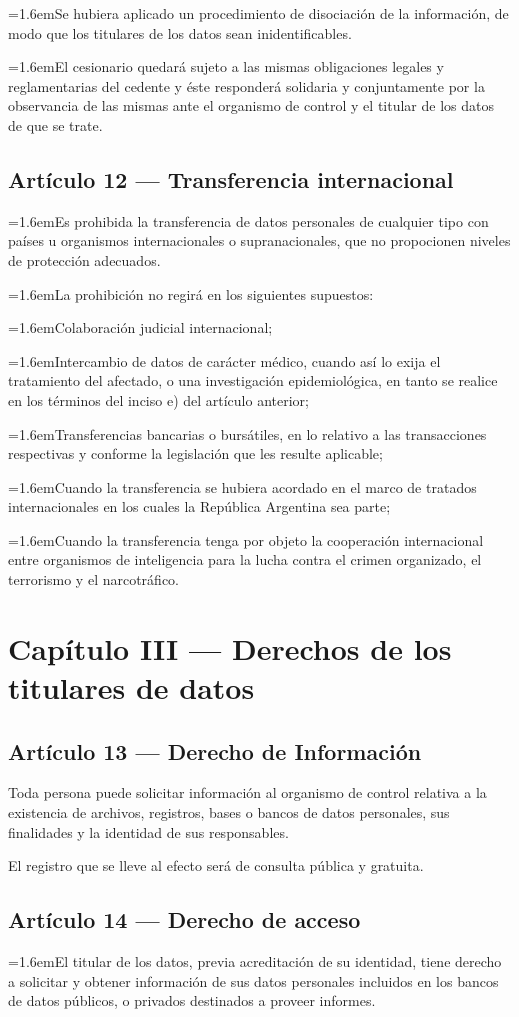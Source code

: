 \documentclass[10pt,a4paper]{article}
\newcommand{\articulo}[1]{\subsection{#1}}
\newcommand{\inciso}[2]{\par{\hangindent=1.6em\hangafter=1\makebox[1.6em][l]{#1}#2\par}}
\begin{document}
\inciso{e)}{Se hubiera aplicado un procedimiento de disociación de la información, de modo que los titulares de los datos sean inidentificables.}

\inciso{4.}{El cesionario quedará sujeto a las mismas obligaciones legales y reglamentarias del cedente y éste responderá solidaria y conjuntamente por la observancia de las mismas ante el organismo de control y el titular de los datos de que se trate.}

\articulo{Artículo 12 --- Transferencia internacional}
\inciso{1.}{Es prohibida la transferencia de datos personales de cualquier tipo con países u organismos internacionales o supranacionales, que no propocionen niveles de protección adecuados.}

\inciso{2.}{La prohibición no regirá en los siguientes supuestos:}

\inciso{a)}{Colaboración judicial internacional;}

\inciso{b)}{Intercambio de datos de carácter médico, cuando así lo exija el tratamiento del afectado, o una investigación epidemiológica, en tanto se realice en los términos del inciso e) del artículo anterior;}

\inciso{c)}{Transferencias bancarias o bursátiles, en lo relativo a las transacciones respectivas y conforme la legislación que les resulte aplicable;}

\inciso{d)}{Cuando la transferencia se hubiera acordado en el marco de tratados internacionales en los cuales la República Argentina sea parte;}

\inciso{e)}{Cuando la transferencia tenga por objeto la cooperación internacional entre organismos de inteligencia para la lucha contra el crimen organizado, el terrorismo y el narcotráfico.}

\section{Capítulo III --- Derechos de los titulares de datos}
\articulo{Artículo 13 --- Derecho de Información}
Toda persona puede solicitar información al organismo de control relativa a la existencia de archivos, registros, bases o bancos de datos personales, sus finalidades y la identidad de sus responsables.

El registro que se lleve al efecto será de consulta pública y gratuita.

\articulo{Artículo 14 --- Derecho de acceso}
\inciso{1.}{El titular de los datos, previa acreditación de su identidad, tiene derecho a solicitar y obtener información de sus datos personales incluidos en los bancos de datos públicos, o privados destinados a proveer informes.}
\end{document}

